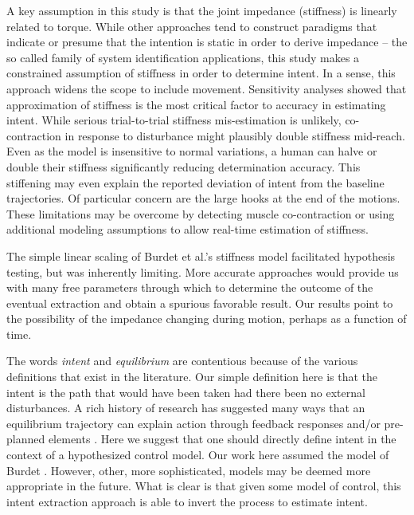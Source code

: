 A key assumption in this study is that the joint impedance (stiffness) is linearly related to torque. While other approaches tend to construct paradigms that indicate or presume that the intention is static in order to derive impedance -- the so called family of system identification applications, this study makes a constrained assumption of stiffness in order to determine intent. In a sense, this approach widens the scope to include movement. Sensitivity analyses showed that approximation of stiffness is the most critical factor to accuracy in estimating intent. While serious trial-to-trial stiffness mis-estimation is unlikely, co-contraction in response to disturbance might plausibly double stiffness mid-reach. Even as the model is insensitive to normal variations, a human can halve or double their stiffness \cite{franklin2007endpoint} significantly reducing determination accuracy. This stiffening may even explain the reported deviation of intent from the baseline trajectories. Of particular concern are the large hooks at the end of the motions. These limitations may be overcome by detecting muscle co-contraction or using additional modeling assumptions to allow real-time estimation of stiffness.

The simple linear scaling of Burdet et al.'s stiffness model \cite{burdet2006stability} facilitated hypothesis testing, but was inherently limiting. More accurate approaches would provide us with many free parameters through which to determine the outcome of the eventual extraction and obtain a spurious favorable result. Our results point to the possibility of the impedance changing during motion, perhaps as a function of time. 

The words \textit{intent} and \textit{equilibrium} are contentious because of the various definitions that exist in the literature. Our simple definition here is that the intent is the path that would have been taken had there been no external disturbances. A rich history of research has suggested many ways that an equilibrium trajectory can explain action through feedback responses \cite{feldman1995origin} and/or pre-planned elements \cite{shadmehr1994adaptive}. Here we suggest that one should directly define intent in the context of a hypothesized control model. Our work here assumed the model of Burdet \cite{burdet2006stability}. However, other, more sophisticated, models may be deemed more appropriate in the future. What is clear is that given some model of control, this intent extraction approach is able to invert the process to estimate intent. 
                                  
